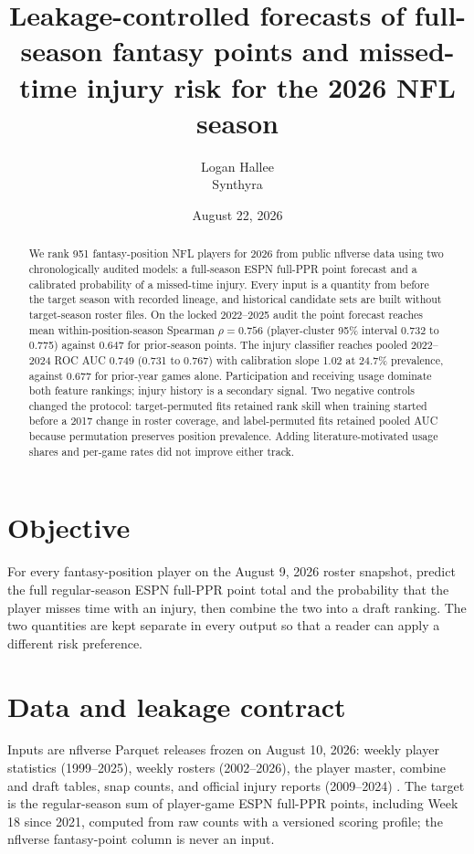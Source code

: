 \documentclass[11pt]{article}
\title{Leakage-controlled forecasts of full-season fantasy points and missed-time injury risk for the 2026 NFL season}
\author{Logan Hallee\\\small Synthyra}
\date{August 22, 2026}
\begin{document}
\maketitle

\begin{abstract}
We rank 951 fantasy-position NFL players for 2026 from public nflverse data using two chronologically audited models: a full-season ESPN full-PPR point forecast and a calibrated probability of a missed-time injury. Every input is a quantity from before the target season with recorded lineage, and historical candidate sets are built without target-season roster files. On the locked 2022--2025 audit the point forecast reaches mean within-position-season Spearman $\rho = 0.756$ (player-cluster 95\% interval 0.732 to 0.775) against 0.647 for prior-season points. The injury classifier reaches pooled 2022--2024 ROC AUC 0.749 (0.731 to 0.767) with calibration slope 1.02 at 24.7\% prevalence, against 0.677 for prior-year games alone. Participation and receiving usage dominate both feature rankings; injury history is a secondary signal. Two negative controls changed the protocol: target-permuted fits retained rank skill when training started before a 2017 change in roster coverage, and label-permuted fits retained pooled AUC because permutation preserves position prevalence. Adding literature-motivated usage shares and per-game rates did not improve either track.
\end{abstract}

\section{Objective}

For every fantasy-position player on the August 9, 2026 roster snapshot, predict the full regular-season ESPN full-PPR point total and the probability that the player misses time with an injury, then combine the two into a draft ranking. The two quantities are kept separate in every output so that a reader can apply a different risk preference.

\section{Data and leakage contract}

Inputs are nflverse Parquet releases frozen on August 10, 2026: weekly player statistics (1999--2025), weekly rosters (2002--2026), the player master, combine and draft tables, snap counts, and official injury reports (2009--2024) \citep{nflverse}. The target is the regular-season sum of player-game ESPN full-PPR points, including Week 18 since 2021, computed from raw counts with a versioned scoring profile; the nflverse fantasy-point column is never an input.
\end{document}

